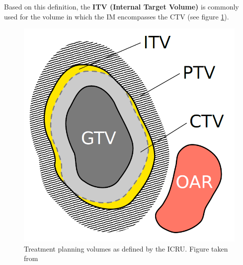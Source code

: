 Based on this definition, the \textbf{ITV (Internal Target Volume)} is commonly used for the volume in which the IM encompasses the CTV 
(see figure \ref{int:margins:fig}). 

\begin{figure}[H]
\begin{center}
\includegraphics[scale=0.3]{./teile/introduction/volumes.png}
\caption{Treatment planning volumes as defined by the ICRU. Figure taken from \cite{Ric12}}
\label{int:margins:fig}
\end{center}
\end{figure}

\vspace*{-0.3cm}

